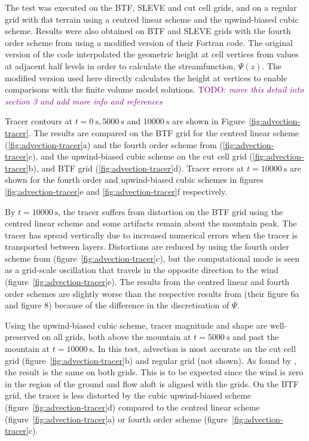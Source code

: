 \documentclass{ametsoc}
\newcommand{\TODO}[1]{\textcolor{purple}{TODO: \emph{#1}}}
\begin{document}
The test was executed on the BTF, SLEVE and cut cell grids, and on a regular grid with flat terrain using a centred linear scheme and the upwind-biased cubic scheme.   Results were also obtained on BTF and SLEVE grids with the fourth order scheme from \citet{schaer2002} using a modified version of their Fortran code.  The original version of the code interpolated the geometric height at cell vertices from values at adjacent half levels in order to calculate the streamfunction, \(\Psi(z)\).  The modified version used here directly calculates the height at vertices to enable comparisons with the finite volume model solutions.  \TODO{move this detail into section 3 and add more info and references}

Tracer contours at \(t = \SI{0}{\second}, \SI{5000}{\second}\) and \(\SI{10000}{\second}\) are shown in Figure~\ref{fig:advection-tracer}.
The results are compared on the BTF grid for the centred linear scheme (\ref{fig:advection-tracer}a) and the fourth order scheme from \citet{schaer2002} (\ref{fig:advection-tracer}c), and the upwind-biased cubic scheme on the cut cell grid (\ref{fig:advection-tracer}b), and BTF grid (\ref{fig:advection-tracer}d).  Tracer errors at \(t = \SI{10000}{\second}\) are shown for the fourth order and upwind-biased cubic schemes in figures \ref{fig:advection-tracer}e and \ref{fig:advection-tracer}f respectively.

By \(t = \SI{10000}{\second}\), the tracer suffers from distortion on the BTF grid using the centred linear scheme and some artifacts remain about the mountain peak.  The tracer has spread vertically due to increased numerical errors when the tracer is transported between layers.  Distortions are reduced by using the fourth order scheme from \citet{schaer2002} (figure~\ref{fig:advection-tracer}c), but the computational mode is seen as a grid-scale oscillation that travels in the opposite direction to the wind (figure~\ref{fig:advection-tracer}e).  The results from the centred linear and fourth order schemes are slightly worse than the respective results from \citet{schaer2002} (their figure 6a and figure 8) because of the difference in the discretisation of $\Psi$.

Using the upwind-biased cubic scheme, tracer magnitude and shape are well-preserved on all grids, both above the mountain at \(t = \SI{5000}{\second}\) and past the mountain at \(t = \SI{10000}{\second}\).  In this test, advection is most accurate on the cut cell grid (figure~\ref{fig:advection-tracer}b) and regular grid (not shown).  As found by \citet{good2014}, the result is the same on both grids.  This is to be expected since the wind is zero in the region of the ground and flow aloft is aligned with the grids.  On the BTF grid, the tracer is less distorted by the cubic upwind-biased scheme (figure~\ref{fig:advection-tracer}d) compared to the centred linear scheme (figure~\ref{fig:advection-tracer}a) or fourth order scheme (figure~\ref{fig:advection-tracer}c).
\end{document}
